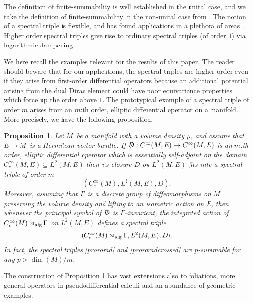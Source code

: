 \documentclass[a4paper,reqno]{amsart}
\numberwithin{equation}{section}
\def\dim{\operatorname{dim}}
\newtheorem{prop}[thm]{Proposition}
\theoremstyle{definition}
\theoremstyle{remark}
\begin{document}
The definition of finite-summability is well established in the unital case, and we take the definition of finite-summability in the non-unital case from \cite[Chapter 3.4]{CGRS11}. The notion of a spectral triple is flexible, and has found applications in a plethora of areas \cite{CGRS11,ConnesETDS,redbook,connesmoscovici, EmDuw,GM15,GMRtwist,GRU,kaspinv,laffinv,leschkaadsf,levipaper,thebeastofmesland}. Higher order spectral triples give rise to ordinary spectral triples (of order $1$) via logarithmic dampening \cite{GMRtwist}.

We here recall the examples relevant for the results of this paper. The reader should beware that for our applications, the spectral triples are higher order even if they arise from first-order differential operators because an additional potential arising from the dual Dirac element could have poor equivariance properties which force up the order above $1$. The prototypical example of a spectral triple of order $m$ arises from an $m$:th order, elliptic differential operator on a manifold. More precisely, we have the following proposition. 


\begin{prop}
\label{adlknadlkna}
Let $M$ be a manifold with a volume density $\mu$, and assume that $E\to M$ is a Hermitean vector bundle. If $\slashed{D}:C^\infty(M,E)\to C^\infty(M,E)$ is an $m$:th order, elliptic differential operator which is essentially self-adjoint on the domain $C^\infty_c(M,E)\subseteq L^2(M,E)$ then its closure $D$ on $L^2(M,E)$ fits into a spectral triple of order $m$
\begin{equation}
\label{prororad}
(C^\infty_c(M),L^2(M,E),D).
\end{equation}
Moreover, assuming that $\Gamma$ is a discrete group of diffeomorphisms on $M$ preserving the volume density and lifting to an isometric action on $E$, then whenever the principal symbol of $\slashed{D}$ is $\Gamma$–invariant, the integrated action of $C^\infty_c(M)\rtimes_{\rm alg}\Gamma$ on $L^2(M,E)$ defines  a spectral triple 
\begin{equation}
\label{prororadcrossed}
(C^\infty_c(M)\rtimes_{\rm alg}\Gamma,L^2(M,E),D).
\end{equation}
In fact, the spectral triples \eqref{prororad} and \eqref{prororadcrossed} are $p$-summable for any $p>\dim(M)/m$.
\end{prop}




The construction of Proposition \ref{adlknadlkna} has vast extensions also to foliations, more general operators in pseudodifferential calculi and an abundance of geometric examples.
\end{document}

